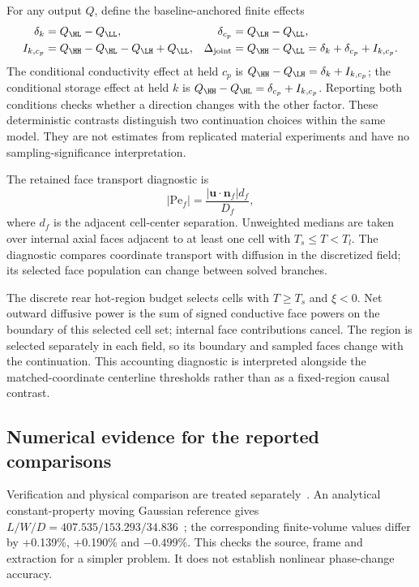 For any output $Q$, define the baseline-anchored finite effects
\begin{align}
 \delta_k&=Q_{\HL}-Q_{\LL}, &
 \delta_{c_p}&=Q_{\LH}-Q_{\LL},\\
 I_{k,c_p}&=Q_{\HH}-Q_{\HL}-Q_{\LH}+Q_{\LL}, &
 \Delta_{\rm joint}&=Q_{\HH}-Q_{\LL}=\delta_k+\delta_{c_p}+I_{k,c_p}.
 \label{eq:contrast}
\end{align}
The conditional conductivity effect at held $c_p$ is $Q_{\HH}-Q_{\LH}=\delta_k+I_{k,c_p}$; the conditional storage effect at held $k$ is $Q_{\HH}-Q_{\HL}=\delta_{c_p}+I_{k,c_p}$. Reporting both conditions checks whether a direction changes with the other factor. These deterministic contrasts distinguish two continuation choices within the same model. They are not estimates from replicated material experiments and have no sampling-significance interpretation.


The retained face transport diagnostic is
\begin{equation}
 |\mathrm{Pe}_f|=\frac{|\bm u\cdot\bm n_f|d_f}{D_f},
 \label{eq:pe}
\end{equation}
where $d_f$ is the adjacent cell-center separation. Unweighted medians are taken over internal axial faces adjacent to at least one cell with $T_s\leq T<T_l$. The diagnostic compares coordinate transport with diffusion in the discretized field; its selected face population can change between solved branches.

The discrete rear hot-region budget selects cells with $T\geq T_s$ and $\xi<0$. Net outward diffusive power is the sum of signed conductive face powers on the boundary of this selected cell set; internal face contributions cancel. The region is selected separately in each field, so its boundary and sampled faces change with the continuation. This accounting diagnostic is interpreted alongside the matched-coordinate centerline thresholds rather than as a fixed-region causal contrast.

\subsection{Numerical evidence for the reported comparisons}
Verification and physical comparison are treated separately~\cite{oberkampf2002}. An analytical constant-property moving Gaussian reference gives $L/W/D=407.535/153.293/34.836$~\um; the corresponding finite-volume values differ by +0.139\%, +0.190\% and $-0.499$\%. This checks the source, frame and extraction for a simpler problem. It does not establish nonlinear phase-change accuracy.


